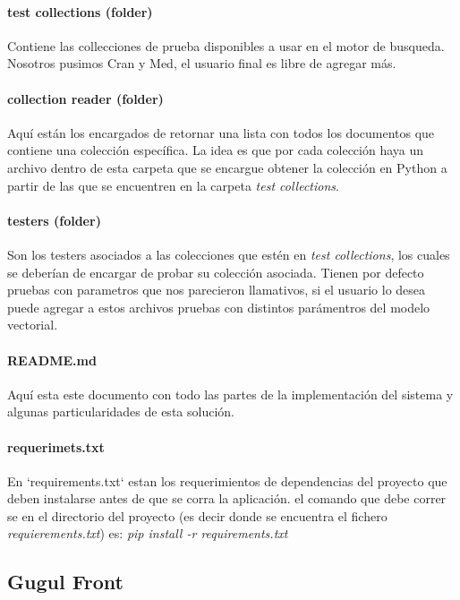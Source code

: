 \documentclass{llncs}
\begin{document}
	\paragraph{test collections (folder)}
	Contiene las collecciones de prueba disponibles a usar en el motor de busqueda. Nosotros pusimos Cran y Med, el usuario final es libre de agregar m\'as.
	
	\paragraph{collection reader  (folder)} 
	Aqu\'i est\'an los encargados de retornar una lista con todos los documentos que contiene una colecci\'on espec\'ifica. La idea es que por cada colecci\'on haya un archivo dentro de esta carpeta que se encargue obtener la colecci\'on en Python a partir de las que se encuentren en la carpeta \textit{test collections}.
	
	
	\paragraph{testers (folder)} 
	Son los testers asociados a las colecciones que est\'en en \textit{test collections}, los cuales se deber\'ian de encargar de probar su colecci\'on asociada. Tienen por defecto pruebas con parametros que nos parecieron llamativos, si el usuario lo desea puede agregar a estos archivos pruebas con distintos par\'amentros del modelo vectorial.
	
	
	\paragraph{README.md} Aqu\'i  esta este documento con todo las partes de la implementaci\'on del sistema y algunas particularidades de esta soluci\'on.
	
	\paragraph{requerimets.txt}
	En `requirements.txt` estan los requerimientos de dependencias del proyecto que deben instalarse antes de que se corra la aplicaci\'on. el comando que debe correr se en el directorio del proyecto (es decir donde se encuentra el fichero \textit{requierements.txt}) es: \textit{pip install -r requirements.txt}
	
	
	
	
	
	
	
	\subsection{Gugul Front}
	
\end{document}
